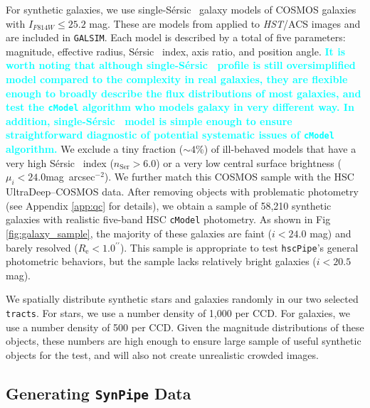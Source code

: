 \documentclass[useamsfonts]{pasj01}
\def\asec{$^{\prime\prime}$}
\def\sb{mag~arcsec$^{-2}$}
\def\ser{{S\'{e}rsic\ }}
\def\hscpipe{\texttt{hscPipe}}
\def\synpipe{\texttt{SynPipe}}
\def\cmodel{\texttt{cModel}}
\def\tracts{\texttt{tracts}}
\def\galsim{\texttt{G}{\scriptsize \texttt{AL}}\texttt{S}{\scriptsize \texttt{IM}}}
\newcommand{\song}[1]{\textcolor{cyan} {\textbf{#1}}}
\begin{document}
    For synthetic galaxies, we use single-\ser{} galaxy models of COSMOS galaxies with 
    $I_{F814W} \leq 25.2$ mag. 
    These are models from \citet{Lackner2012} applied to \textit{HST}/ACS images and 
    are included in \galsim{}. 
    Each model is described by a total of five parameters: magnitude, effective radius,
    \ser{} index, axis ratio, and position angle.
    \song{
    It is worth noting that although single-\ser{} profile is still oversimplified model 
    compared to the complexity in real galaxies, they are flexible enough to broadly 
    describe the flux distributions of most galaxies, and test the \cmodel{} algorithm 
    who models galaxy in very different way.
    In addition, single-\ser{} model is simple enough to ensure straightforward 
    diagnostic of potential systematic issues of \cmodel{} algorithm. 
    }
    We exclude a tiny fraction (${\sim}4$\%) of ill-behaved models that have a very 
    high \ser{} index ($n_{\mathrm{Ser}} > 6.0$) or a very low central surface 
    brightness ($\mu_{i} < 24.0$\sb).
    We further match this COSMOS sample with the HSC UltraDeep--COSMOS data.
    After removing objects with problematic photometry (see Appendix \ref{app:qc} for 
    details), we obtain a sample of 58,210 synthetic galaxies with realistic 
    five-band HSC \cmodel{} photometry.
    As shown in Fig \ref{fig:galaxy_sample}, the majority of these galaxies are
    faint ($i<24.0$ mag) and barely resolved ($R_{\mathrm{e}}< 1.0$\asec).
    This sample is appropriate to test \hscpipe{}'s general photometric behaviors, 
    but the sample lacks relatively bright galaxies ($i<20.5$ mag).


    We spatially distribute synthetic stars and galaxies randomly in our two selected 
    \tracts{}. 
    For stars, we use a number density of 1,000 per CCD. 
    For galaxies, we use a number density of 500 per CCD. 
    Given the magnitude distributions of these objects, these numbers are high enough 
    to ensure large sample of useful synthetic objects for the test, and will also not
    create unrealistic crowded images.


\subsection{Generating \synpipe{} Data}
    \label{ssec:running}
\end{document}
